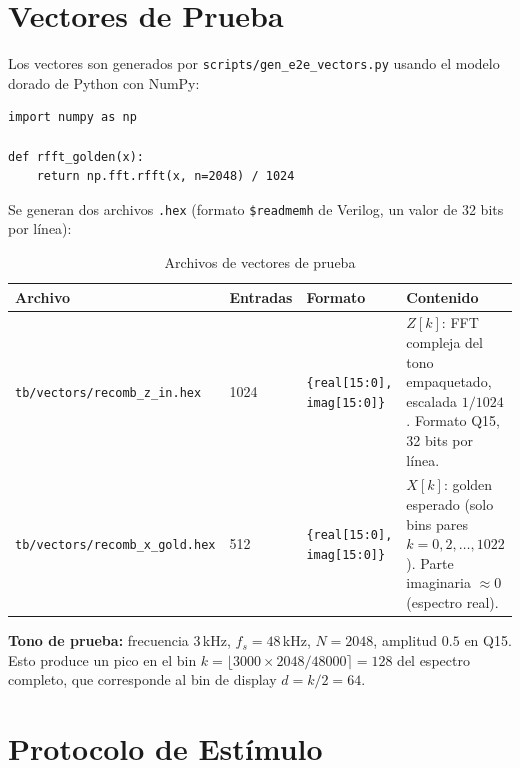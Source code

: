 \documentclass[12pt, a4paper]{article}
\begin{document}
\section{Vectores de Prueba}

Los vectores son generados por \texttt{scripts/gen\_e2e\_vectors.py} usando
el modelo dorado de Python con NumPy:

\begin{Verbatim}[fontsize=\footnotesize, frame=single]
import numpy as np

def rfft_golden(x):
    return np.fft.rfft(x, n=2048) / 1024
\end{Verbatim}

Se generan dos archivos \texttt{.hex} (formato \texttt{\$readmemh} de
Verilog, un valor de 32 bits por línea):

\begin{table}[H]
\centering
\caption{Archivos de vectores de prueba}
\begin{tabular}{p{3.5cm} p{2.5cm} p{2.5cm} p{5.5cm}}
\toprule
\textbf{Archivo} & \textbf{Entradas} & \textbf{Formato} & \textbf{Contenido} \\
\midrule
\texttt{tb/vectors/}\newline\texttt{recomb\_z\_in.hex}
  & 1024 & \texttt{\{real[15:0],}\newline\texttt{ imag[15:0]\}}
  & $Z[k]$: FFT compleja del tono empaquetado, escalada $1/1024$.
        Formato Q15, 32 bits por línea. \\
\texttt{tb/vectors/}\newline\texttt{recomb\_x\_gold.hex}
  & 512 & \texttt{\{real[15:0],}\newline\texttt{ imag[15:0]\}}
  & $X[k]$: golden esperado (solo bins pares $k=0,2,\ldots,1022$).
        Parte imaginaria $\approx 0$ (espectro real). \\
\bottomrule
\end{tabular}
\end{table}

\textbf{Tono de prueba:} frecuencia 3\,kHz, $f_s=48$\,kHz, $N=2048$,
amplitud $0.5$ en Q15. Esto produce un pico en el bin
$k = \lfloor 3000 \times 2048 / 48000 \rceil = 128$ del espectro completo,
que corresponde al bin de display $d = k/2 = 64$.

\section{Protocolo de Estímulo}
\end{document}
